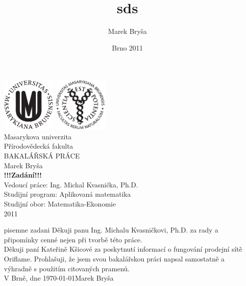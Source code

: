 \documentclass[a4wide,12pt]{report}
\title{sds}
\author{Marek Bryša}
\date{Brno 2011}
\begin{document}
\thispagestyle{empty}
\pagebreak
\mbox{}%
\vfill

\begin{center}
\includegraphics[width=0.2\textwidth]{./znak_MU_cerny.eps}\hspace{2cm}
\includegraphics[width=0.2\textwidth]{./znak_PrF_cerny.eps}\\[1cm]    

{\LARGE Masarykova univerzita}\\[0.5cm]
{\LARGE Přírodovědecká fakulta}\\[0.5cm]
{\LARGE BAKALÁŘSKÁ PRÁCE}\\[0.5cm]
{\LARGE Marek Bryša}\\[0.5cm]

{ \huge \bfseries !!!Zadání!!!}\\[0.4cm]
{\large Vedoucí práce: Ing. Michal Kvasnička, Ph.D.}\\[0.5cm]
{\large Studijní program: Aplikovaná matematika}\\
{\large Studijní obor: Matematika-Ekonomie}\\[0.5cm]
{\large 2011}\\
\vspace{5cm}

\vfill
\pagebreak

\end{center}

\newpage
\thispagestyle{empty}
pisemne zadani
\newpage
\thispagestyle{empty}
\vspace{2cm}
\noindent
Děkuji panu Ing. Michalu Kvasničkovi, Ph.D. za rady a připomínky cenné nejen při tvorbě této práce.\\
Děkuji paní Kateřině Kšicové za poskytnutí informací o fungování prodejní sítě Oriflame.
\vfill
\noindent
Prohlašuji, že jsem svou bakalářskou práci napsal samostatně a výhradně s použitím citovaných pramenů.\\[3cm]
V Brně, dne \today \hfill Marek Bryša\hspace{3cm}
\vspace{1.5cm}
\newpage
\newpage
\thispagestyle{empty}
\end{document}
